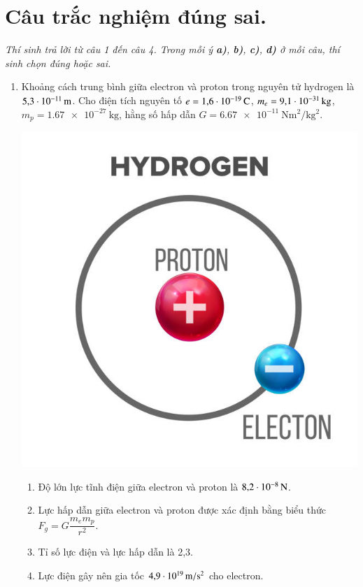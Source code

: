 \section{Câu trắc nghiệm đúng sai.} 
\textit{Thí sinh trả lời từ câu 1 đến câu 4. Trong mỗi ý \textbf{a)}, \textbf{b)}, \textbf{c)}, \textbf{d)} ở mỗi câu, thí sinh chọn đúng hoặc sai.}
\begin{enumerate}[label=\bfseries Câu \arabic*:]
	\item Khoảng cách trung bình giữa electron và proton trong nguyên tử hydrogen là $\SI{5.3E-11}{\meter}$. Cho điện tích nguyên tố $e=\SI{1.6E-19}{\coulomb}$, $m_e=\SI{9.1E-31}{\kilogram}$, $m_p=\SI{1.67e-27}{\kilogram}$, hằng số hấp dẫn $G=\SI{6.67e-11}{\newton\meter^2/\kilogram^2}$.
	\begin{center}
		\includegraphics[width=0.25\linewidth]{../figs/PH11-FinalSem2-02-5}
	\end{center}
	\begin{enumerate}[label=\alph*)]
		\item Độ lớn lực tĩnh điện giữa electron và proton là $\SI{8.2E-8}{\newton}$.
		\item Lực hấp dẫn giữa electron và proton được xác định bằng biểu thức $F_g=G\dfrac{m_em_p}{r^2}$.
		\item Tỉ số lực điện và lực hấp dẫn là 2,3.
		\item Lực điện gây nên gia tốc $\SI{4.9E19}{\meter/\second^2}$ cho electron.
	\end{enumerate}


\end{enumerate}
